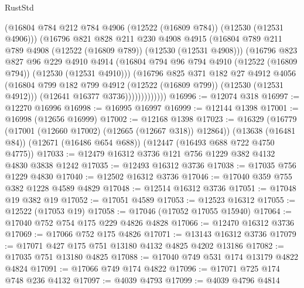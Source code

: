 \begin{lexlean}{RustStd}
\begin{coremodule}
                      (@16804 @784 @212 @784 @4906 (@12522 (@16809 @784)) (@12530 (@12531 @4906)))
                      (@16796
                        @821
                        @828
                        @211
                        @230
                        @4908
                        @4915
                        (@16804 @789 @211 @789 @4908 (@12522 (@16809 @789)) (@12530 (@12531 @4908)))
                        (@16796
                          @823
                          @827
                          @96
                          @229
                          @4910
                          @4914
                          (@16804
                            @794
                            @96
                            @794
                            @4910
                            (@12522 (@16809 @794))
                            (@12530 (@12531 @4910)))
                          (@16796
                            @825
                            @371
                            @182
                            @27
                            @4912
                            @4056
                            (@16804
                              @799
                              @182
                              @799
                              @4912
                              (@12522 (@16809 @799))
                              (@12530 (@12531 @4912)))
                            (@12641 @16377 @3736)))))))))))))
@16996 := @12074 @318
@16997 := @12270 @16996
@16998 := @16995 @16997
@16999 := @12144 @1398
@17001 := @16998 (@12656 @16999)
@17002 := @12168 @1398
@17023 := @16329
    (@16779 (@17001 (@12660 @17002) (@12665 (@12667 @318)) @12864))
    (@13638 (@16481 @84))
    (@12671 (@16486 @654 @688))
    (@12447 (@16493 @688 @722 @4750 @4775))
@17033 := @12479 @16312 @3736 @121 @756 @1229 @382 @4132 @4830 @3838 @1242
@17035 := @12493 @16312 @3736
@17038 := @17035 @756 @1229 @4830
@17040 := @12502 @16312 @3736
@17046 := @17040 @359 @755 @382 @1228 @4589 @4829
@17048 := @12514 @16312 @3736
@17051 := @17048 @19 @382 @19
@17052 := @17051 @4589
@17053 := @12523 @16312
@17055 := @12522 (@17053 @19)
@17058 := @17046 (@17052 @17055 @15940)
@17064 := @17040 @752 @754 @175 @229 @4826 @4828
@17066 := @12470 @16312 @3736
@17069 := @17066 @752 @175 @4826
@17071 := @13143 @16312 @3736
@17079 := @17071 @427 @175 @751 @13180 @4132 @4825 @4202 @13186
@17082 := @17035 @751 @13180 @4825
@17088 := @17040 @749 @531 @174 @13179 @4822 @4824
@17091 := @17066 @749 @174 @4822
@17096 := @17071 @725 @174 @748 @236 @4132
@17097 := @4039 @4793
@17099 := @4039 @4796 @4814

\end{coremodule}
\end{lexlean}

